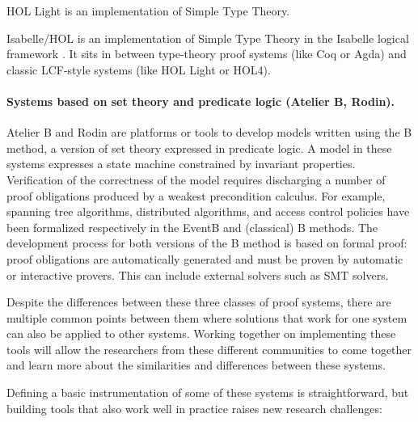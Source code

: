 HOL Light is an implementation of Simple Type Theory.

Isabelle/HOL is an implementation of Simple Type Theory in the
Isabelle logical framework \cite{paulson700}. It sits in
between type-theory proof systems (like Coq or Agda) and classic
LCF-style systems (like HOL Light or HOL4).

\paragraph*{Systems based on set theory and predicate logic (Atelier B,  Rodin).}

Atelier B and Rodin are platforms or tools to develop models written
using the B method, a version of set theory expressed in predicate
logic.  A model in these systems expresses a state machine constrained
by invariant properties. Verification of the correctness of the model requires
discharging a number of proof obligations produced by a weakest precondition
calculus. For example, spanning tree algorithms, distributed
algorithms, and access control policies have been formalized
respectively in the EventB and (classical) B methods.  The development process for
both versions of the B method is based on formal proof: proof obligations are
automatically generated and must be proven by automatic or interactive
provers. This can include external solvers such as SMT solvers.

\bigskip

Despite the differences between these three classes of proof systems,
there are multiple common points between them where solutions that work
for one system can also be applied to other systems. Working together
on implementing these tools will allow the researchers from these
different communities to come together and learn more about the
similarities and differences between these systems.

Defining a basic instrumentation of some of these systems is
straightforward, but building tools that also work well in practice
raises new research challenges:


